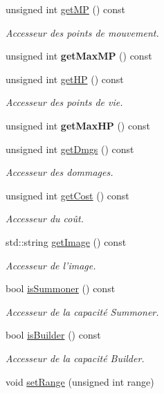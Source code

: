 \begin{DoxyCompactItemize}
\item 
unsigned int \hyperlink{classUnit_ab63830d1bc4db11dc38634d5efe1401e}{get\+M\+P} () const 
\begin{DoxyCompactList}\small\item\em Accesseur des points de mouvement. \end{DoxyCompactList}\item 
\hypertarget{classUnit_ae8eea4bbc468f95b7ce52edddc37de53}{unsigned int {\bfseries get\+Max\+M\+P} () const }\label{classUnit_ae8eea4bbc468f95b7ce52edddc37de53}

\item 
unsigned int \hyperlink{classUnit_a2114b6ef6c9af9dddeb88aeddbc22043}{get\+H\+P} () const 
\begin{DoxyCompactList}\small\item\em Accesseur des points de vie. \end{DoxyCompactList}\item 
\hypertarget{classUnit_aa04fff8cffcb1da0e0fb4cbfda3e37d7}{unsigned int {\bfseries get\+Max\+H\+P} () const }\label{classUnit_aa04fff8cffcb1da0e0fb4cbfda3e37d7}

\item 
unsigned int \hyperlink{classUnit_a95d364646c70c571be6c010506a6eb42}{get\+Dmgs} () const 
\begin{DoxyCompactList}\small\item\em Accesseur des dommages. \end{DoxyCompactList}\item 
unsigned int \hyperlink{classUnit_a0fab4c57cd63d3a8c7019d074a645a87}{get\+Cost} () const 
\begin{DoxyCompactList}\small\item\em Accesseur du coût. \end{DoxyCompactList}\item 
std\+::string \hyperlink{classUnit_ab2c57e3a68452586ef2b2585efa75439}{get\+Image} () const 
\begin{DoxyCompactList}\small\item\em Accesseur de l'image. \end{DoxyCompactList}\item 
bool \hyperlink{classUnit_a1a6263ae2b5dea9d789e15ed8992b5df}{is\+Summoner} () const 
\begin{DoxyCompactList}\small\item\em Accesseur de la capacité Summoner. \end{DoxyCompactList}\item 
bool \hyperlink{classUnit_afb4ddd2c148dcedcf76767a38096fbe3}{is\+Builder} () const 
\begin{DoxyCompactList}\small\item\em Accesseur de la capacité Builder. \end{DoxyCompactList}\item 
\hypertarget{classUnit_a7b6b1b0eaebc2ac76b263aac194bcac4}{void \hyperlink{classUnit_a7b6b1b0eaebc2ac76b263aac194bcac4}{set\+Range} (unsigned int range)}\label{classUnit_a7b6b1b0eaebc2ac76b263aac194bcac4}


\end{DoxyCompactItemize}
